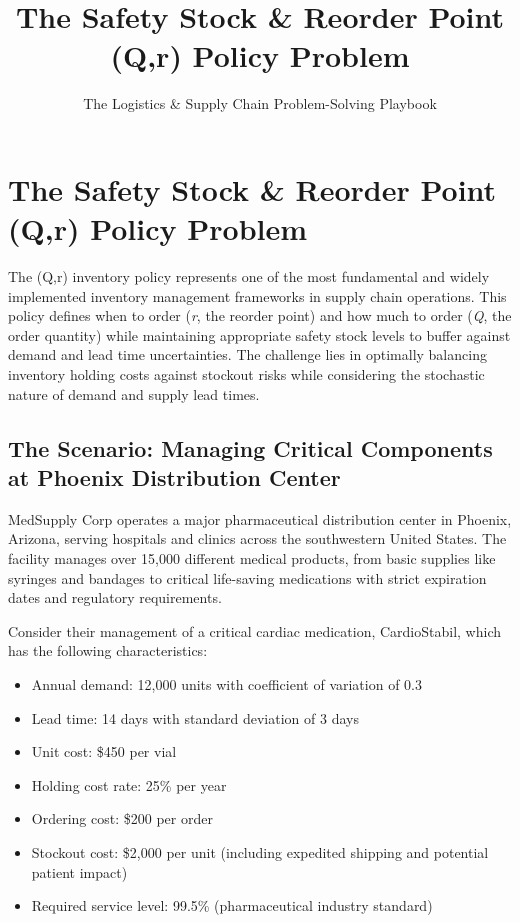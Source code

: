 \documentclass{article}
\title{The Safety Stock \& Reorder Point (Q,r) Policy Problem}
\author{The Logistics \& Supply Chain Problem-Solving Playbook}
\date{}
\begin{document}
\maketitle

\section{The Safety Stock \& Reorder Point (Q,r) Policy Problem}

The (Q,r) inventory policy represents one of the most fundamental and widely implemented inventory management frameworks in supply chain operations. This policy defines when to order (\textit{r}, the reorder point) and how much to order (\textit{Q}, the order quantity) while maintaining appropriate safety stock levels to buffer against demand and lead time uncertainties. The challenge lies in optimally balancing inventory holding costs against stockout risks while considering the stochastic nature of demand and supply lead times.

\subsection{The Scenario: Managing Critical Components at Phoenix Distribution Center}

MedSupply Corp operates a major pharmaceutical distribution center in Phoenix, Arizona, serving hospitals and clinics across the southwestern United States. The facility manages over 15,000 different medical products, from basic supplies like syringes and bandages to critical life-saving medications with strict expiration dates and regulatory requirements.

Consider their management of a critical cardiac medication, CardioStabil, which has the following characteristics:
\begin{itemize}
\item Annual demand: 12,000 units with coefficient of variation of 0.3
\item Lead time: 14 days with standard deviation of 3 days
\item Unit cost: \$450 per vial
\item Holding cost rate: 25\% per year
\item Ordering cost: \$200 per order
\item Stockout cost: \$2,000 per unit (including expedited shipping and potential patient impact)
\item Required service level: 99.5\% (pharmaceutical industry standard)
\end{itemize}
\end{document}
